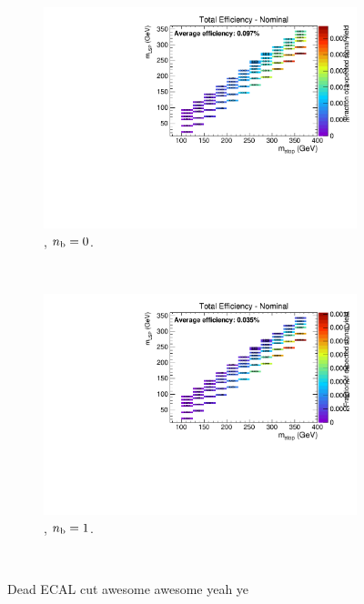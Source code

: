 \begin{figure}[h!]
\begin{subfigure}[b]{0.4\textwidth}
    \includegraphics[width=\textwidth, page=3]{Figs/sms/t2cc/v24/DeadECAL_T2cc_v24_eq0b_ge4j_incl.pdf}
    \caption{\njhigh, $n_{\text{b}} = 0$.}
  \end{subfigure}\\
  \begin{subfigure}[b]{0.4\textwidth}
    \includegraphics[width=\textwidth, page=3]{Figs/sms/t2cc/v24/DeadECAL_T2cc_v24_eq1b_ge4j_incl.pdf}
    \caption{\njhigh, $n_{\text{b}} = 1$.}
  \end{subfigure}\\
  \caption{Dead ECAL cut awesome awesome yeah ye}
  \label{fig:sms-deadecal-t2cc}
\end{figure}




